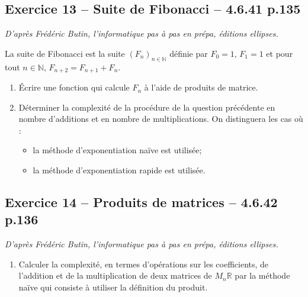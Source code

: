 \documentclass[10pt,fleqn]{article} %
\begin{document}
\begin{multicols}{2}
\subsection*{Exercice 13 -- Suite de Fibonacci -- 4.6.41 p.135}
\begin{flushright}
\textit{D'après Frédéric Butin, l'informatique pas à pas en prépa, éditions ellipses.}
\end{flushright}

La suite de Fibonacci est la suite $\left( F_n \right)_{n \in \mathbb{N}}$ définie par $F_0=1$, $F_1=1$ et pour tout $n\in \mathbb{N}$, $F_{n+2}=F_{n+1}+F_{n}$.

\begin{enumerate}
\item Écrire une fonction qui calcule $F_n$ à l'aide de produits de matrice.
\item Déterminer la complexité de la procédure de la question précédente en nombre d'additions et en nombre de multiplications. On distinguera les cas où :
\begin{itemize}
\item la méthode d'exponentiation naïve est utilisée;
\item la méthode d'exponentiation rapide est utilisée.
\end{itemize}
\end{enumerate}


\subsection*{Exercice 14 -- Produits de matrices -- 4.6.42 p.136}
\begin{flushright}
\textit{D'après Frédéric Butin, l'informatique pas à pas en prépa, éditions ellipses.}
\end{flushright}
\begin{enumerate}
\item Calculer la complexité, en termes d'opérations sur les coefficients, de l'addition et de la multiplication de deux matrices de $M_n\mathbb{R}$ par la méthode naïve qui consiste à utiliser la définition du produit.


\end{enumerate}
\end{multicols}
\end{document}
